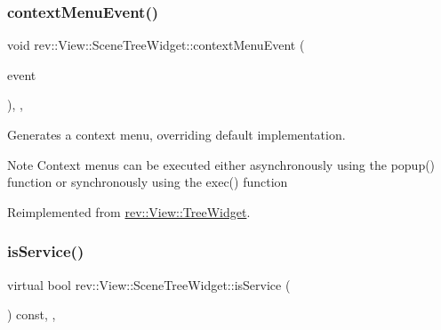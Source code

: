 \mbox{\label{classrev_1_1_view_1_1_scene_tree_widget_a262a8da9d0d6dd99cad8412030dfe1bb}} 
\subsubsection{\texorpdfstring{contextMenuEvent()}{contextMenuEvent()}}
{\footnotesize\ttfamily void rev\+::\+View\+::\+Scene\+Tree\+Widget\+::context\+Menu\+Event (\begin{DoxyParamCaption}\item[{Q\+Context\+Menu\+Event $\ast$}]{event }\end{DoxyParamCaption})\hspace{0.3cm}{\ttfamily [override]}, {\ttfamily [protected]}, {\ttfamily [virtual]}}



Generates a context menu, overriding default implementation. 

\begin{DoxyNote}{Note}
Context menus can be executed either asynchronously using the popup() function or synchronously using the exec() function 
\end{DoxyNote}


Reimplemented from \mbox{\hyperlink{classrev_1_1_view_1_1_tree_widget_a47fe709b7b08a5d327a66d091e64820b}{rev\+::\+View\+::\+Tree\+Widget}}.

\mbox{\label{classrev_1_1_view_1_1_scene_tree_widget_aa9504c5744ff81177fdf79483a3e8dc5}} 
\subsubsection{\texorpdfstring{isService()}{isService()}}
{\footnotesize\ttfamily virtual bool rev\+::\+View\+::\+Scene\+Tree\+Widget\+::is\+Service (\begin{DoxyParamCaption}{ }\end{DoxyParamCaption}) const\hspace{0.3cm}{\ttfamily [inline]}, {\ttfamily [override]}, {\ttfamily [virtual]}}



